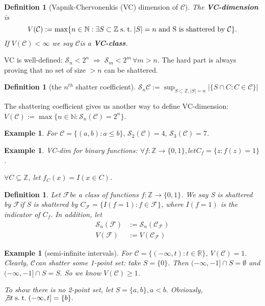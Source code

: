 \documentclass[10pt]{article}
\newtheorem{definition}[def]{Definition}
\newtheorem{example}[ex]{Example}
\newcommand{\F}{\mathcal{F}}
\newcommand{\R}{\mathbb{R}}
\renewcommand{\S}{\mathcal{S}}
\newcommand{\Z}{\mathbb{Z}}
\newcommand{\N}{\mathbb{N}}
\renewcommand{\F}{\ensuremath{\mathcal{F}}}
\newcommand{\C}{\ensuremath{\mathcal{C}}}
\newcommand{\st}{\ensuremath{\;\mathrm{s.}\;\mathrm{t.}\;}}
\newcommand{\then}{\ensuremath{\;\Rightarrow\;}}
\begin{document}
\begin{definition}[Vapnik-Chervonenkis (VC) dimension of \C]
  The \textbf{VC-dimension} is 
  \[
  V(\C) := \max\{n\in\N:\exists S\subset\Z\st |S|=n \text{ and S is shattered by \C}\}.
  \]
  If $V(\C)<\infty$ we say \C is a \textbf{VC-class}.
 \end{definition}

VC is well-defined: $\S_n<2^n \then \S_m<2^m\,\forall m>n$.
The hard part is always proving that no set of size $> n$ can be shattered.

\begin{definition}[the $n^{th}$ shatter coefficient]
$\mathcal{S}_n\C:=\sup_{S\subset\Z,|S|=n}|\{S\cap C:C\in\C\}|$
\end{definition}
The shattering coefficient gives us another way to define VC-dimension: $V(\C) := \max\{n\in\N:\S_n(\C)=2^n\}$.

\begin{example}
  For $\C=\{(a,b):a\leq b\},\,\S_2(\C)=4,\,\S_3(\C)=7$.
\end{example}    

\begin{example}
  VC-dim for binary functions:
  $\forall f:\Z\to\{0,1\},  let C_f=\{z:f(z)=1\}$.
  
$\forall C\subseteq\Z$, let $f_C(x)=I(x\in C)$.
\end{example}

\begin{definition}
Let \F be a class of functions $f:\Z\to\{0,1\}$.  We say S is shattered by \F if S is shattered by $C_\F = \{I(f=1):f\in\F\}$,
where $I(f=1)$ is the indicator of $C_f.$  In addition, let
\begin{align}
\S_n(\F) &:=\S_n(\C_\F)\\
V(\F)&:=V(\C_\F)
\end{align}
\end{definition}

\begin{example}[semi-infinite intervals]
For $\C = \{(-\infty,t):t\in\R\}$, $V(\C) = 1$. Clearly, \C can shatter some 1-point set: take $S=\{0\}$.  Then $(-\infty,-1]\cap S = \emptyset$ and $ (-\infty,-1]\cap S = S.$
    So we know $V(\C)\geq 1$.
    
To show there is no 2-point set,
let $S=\{a,b\}, a<b.$
Obviously, $\not\exists t\st(-\infty,t]=\{b\}.$
\end{example}
\end{document}
